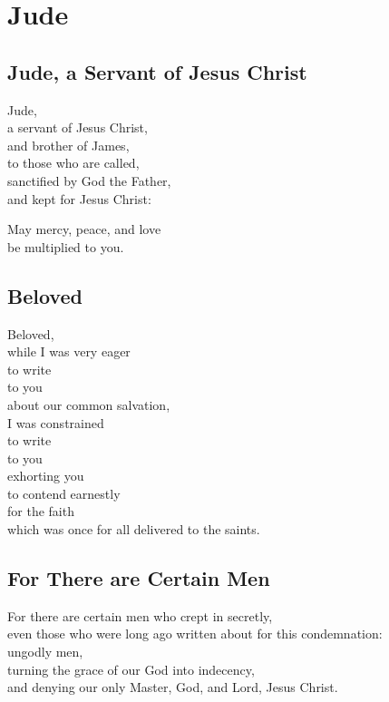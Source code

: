 \chapter{Jude}

\newpage\section{Jude, a Servant of Jesus Christ}

Jude,
\\
a servant of Jesus Christ,
\\
and brother of James,
\\
to those who are called,
\\
sanctified by God the Father,
\\
and kept for Jesus Christ:

May mercy,
peace,
and love
\\
\tab
be multiplied to you.

\newpage\section{Beloved}

Beloved,
\\
while I was very eager
\\
\tab{}
to write
\\
\tab{}
\tab{}
to you
\\
\tab{}
\tab{}
\tab{}
about our common salvation,
\\
I was constrained
\\
\tab{}
to write
\\
\tab{}
\tab{}
to you
\\
\tab{}
\tab{}
\tab{}
exhorting you
\\
\tab{}
\tab{}
\tab{}
\tab{}
to contend earnestly
\\
\tab{}
\tab{}
\tab{}
\tab{}
\tab{}
for the faith
\\
\tab{}
\tab{}
\tab{}
\tab{}
\tab{}
\tab{}
which was once for all
delivered to the saints.

\newpage\section{For There are Certain Men}

For there are certain men who crept in secretly,
\\
even those who were long ago written about for this condemnation:
\\
\tab{}
ungodly men,
\\
\tab{}
\tab{}
turning the grace of our God into indecency,
\\
\tab{}
\tab{}
and denying our only Master,
God,
and Lord,
Jesus Christ.

